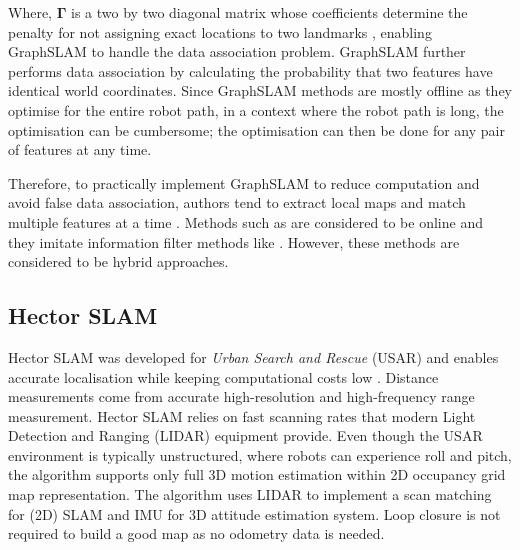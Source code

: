 Where, $\mathbf{\Gamma}$ is a two by two diagonal matrix whose coefficients determine the penalty for not assigning exact locations to two landmarks \cite{Yufeng2003}, enabling GraphSLAM to handle the data association problem. GraphSLAM further performs data association by calculating the probability that two features have identical world coordinates. Since GraphSLAM methods are mostly offline as they optimise for the entire robot path, in a context where the robot path is long, the optimisation can be cumbersome; the optimisation can then be done for any pair of features at any time. 

Therefore, to practically implement GraphSLAM to reduce computation and avoid false data association, authors tend to extract local maps and match multiple features at a time \cite{Lu1997}. Methods such as \cite{Michael2004, Newman2003, Paskin2003, Thrun2008} are considered to be online and they imitate information filter methods like \cite{Thrun2008, Nettleton2006, Newman1999, Newman2001, ThrunLiu2004}. However, these methods are considered to be hybrid approaches.


\subsection{Hector SLAM}
\label{sec:hector_slam}
Hector SLAM was developed for \textit{Urban Search and Rescue} (USAR) and enables accurate localisation while keeping computational costs low \cite{Kohlbrecher2011a}. Distance measurements come from accurate high-resolution and high-frequency range measurement. Hector SLAM relies on fast scanning rates that modern Light Detection and Ranging (LIDAR) equipment provide. Even though the USAR environment is typically unstructured, where robots can experience roll and pitch, the algorithm supports only full 3D motion estimation within 2D occupancy grid map representation. The algorithm uses LIDAR to implement a scan matching for (2D) SLAM and IMU for 3D attitude estimation system. Loop closure is not required to build a good map as no odometry data is needed.

